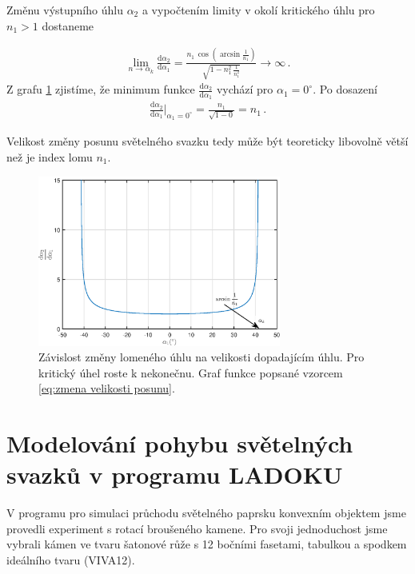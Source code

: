 Změnu výstupního úhlu $\alpha_2$ a vypočtením limity v okolí kritického úhlu pro $ n_1>1$ dostaneme 

\begin{eqnarray}
\lim_{n \to \alpha_k}\frac{\mathrm{d}\alpha_2}{\mathrm{d}\alpha_1} = \frac{n_1\,\cos(\arcsin\frac{1}{n_1})}{\sqrt{1-n_1^2\,\frac{1}{n_1^2}}} \to \infty\,.
\label{eq:zmena velikosti posunu}  
\end{eqnarray}
Z grafu \ref{fig:derivace uhlu} zjistíme, že minimum funkce $\frac{\mathrm{d}\alpha_2}{\mathrm{d}\alpha_1}$ vychází pro $ \alpha_1 = 0^\circ $. Po dosazení
\begin{eqnarray}
{\frac{\mathrm{d}\alpha_2}{\mathrm{d}\alpha_1}}\biggr\rvert_{\alpha_1 = 0^\circ}= \frac{n_1}{\sqrt{1-0}} = n_1\,.
\end{eqnarray}


Velikost změny posunu světelného svazku tedy může být teoreticky libovolně větší než je index lomu $n_1$. 

\begin{figure}[h!]
\begin{center}
\includegraphics[width = 8cm]{figures/derivace.eps}
\end{center}
\caption{Závislost změny lomeného úhlu na velikosti dopadajícím úhlu. Pro kritický úhel roste k nekonečnu. Graf funkce popsané vzorcem \ref{eq:zmena velikosti posunu}.}
\label{fig:derivace uhlu}
\end{figure}



\section{Modelování pohybu světelných svazků v programu LADOKU}

V programu pro simulaci průchodu světelného paprsku konvexním objektem jsme provedli experiment s rotací broušeného kamene. Pro svoji jednoduchost jsme vybrali kámen ve tvaru šatonové růže s 12 bočními fasetami, tabulkou a spodkem ideálního tvaru (VIVA12).

